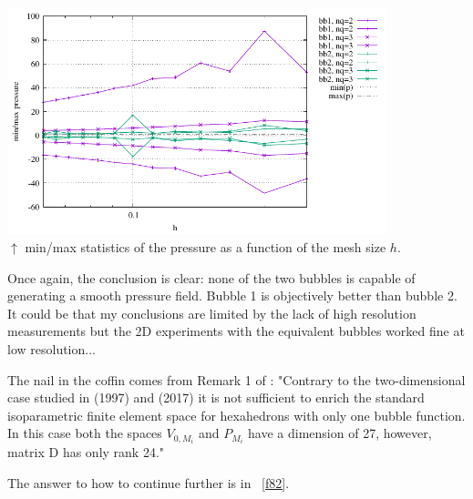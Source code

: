 \begin{center}
\includegraphics[width=11cm]{python_codes/fieldstone_75/results/mms3D/p_stats.pdf}\\
{\captionfont $\uparrow$ min/max statistics of the pressure as a function of the mesh size $h$.}
\end{center}




Once again, the conclusion is clear: none of the two bubbles is capable of generating a 
smooth pressure field. Bubble 1 is objectively better than bubble 2.
It could be that my conclusions are limited by the lack of high resolution measurements
but the 2D experiments with the equivalent bubbles worked fine at low resolution...

The nail in the coffin comes from Remark 1 of \textcite{kahp20}:
"Contrary to the two-dimensional case studied
in \textcite{bai97} (1997) and \textcite{lami17} (2017) it is not sufficient to enrich the 
standard isoparametric finite element space for hexahedrons with only one
bubble function. In this case both the spaces $V_{0,M_i}$ and $P_{M_i}$
have a dimension of 27, however, matrix D has only rank 24."

The answer to how to continue further is in \stone~\ref{f82}.
